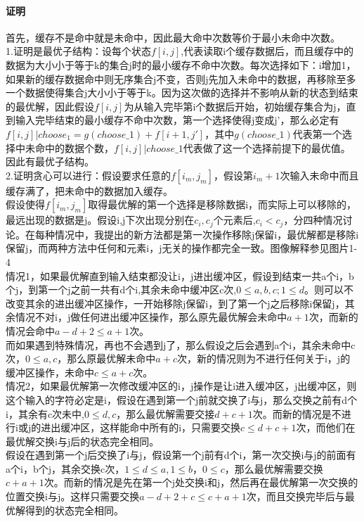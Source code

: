 \documentclass{article}
\begin{document}
\begin{CJK}{UTF8}{gkai}
\paragraph{证明}
首先，缓存不是命中就是未命中，因此最大命中次数等价于最小未命中次数。\\
1.证明是最优子结构：设每个状态$f[i,j]$,代表读取i个缓存数据后，而且缓存中的数据为大小小于等于k的集合j时的最小缓存不命中次数。每次选择如下：i增加1，如果新的缓存数据命中则无序集合j不变，否则j先加入未命中的数据，再移除至多一个数据使得集合j大小小于等于k。因为这次做的选择并不影响从新的状态到结束的最优解，因此假设$f[i,j]$为从输入完毕第i个数据后开始，初始缓存集合为j，直到输入完毕结束的最小缓存不命中次数，第一个选择使得j变成j'，那么必定有$f[i,j]|choose_1=g(choose\_1)+f[i+1,j']$，其中$g(choose\_1)$代表第一个选择中未命中的数据个数，$f[i,j]|choose\_1$代表做了这一个选择前提下的最优值。因此有最优子结构。\\
2.证明贪心可以进行：假设要求任意的$f[i_{m},j_{m}]$，假设第$i_{m}+1$次输入未命中而且缓存满了，把未命中的数据加入缓存。\\
假设使得$f[i_{m},j_{m}]$取得最优解的第一个选择是移除数据i，而实际上可以移除的，最远出现的数据是j。假设i,j下次出现分别在$c_{i},c_{j}$个元素后,$c_{i}<c_{j}$，分四种情况讨论。在每种情况中，我提出的新方法都是第一次操作移除j保留i，最优解都是移除i保留j，而两种方法中任何和元素i，j无关的操作都完全一致。图像解释参见图片1-4\\
情况1，如果最优解直到输入结束都没让i，j进出缓冲区，假设到结束一共a个i，b个j，到第一个j之前一共有d个i,其余未命中缓冲区c次,$0\leq a,b,c;1\leq d$。则可以不改变其余的进出缓冲区操作，一开始移除j保留i，到了第一个j之后移除i保留j，其余情况不对i，j做任何进出缓冲区操作，那么原先最优解会未命中$a+1$次，而新的情况会命中$a-d+2\leq a+1$次。\\
而如果遇到特殊情况，再也不会遇到j了，那么假设之后会遇到a个i，其余未命中c次，$0\leq a,c$，那么原最优解未命中$a+c$次，新的情况则为不进行任何关于i，j的缓冲区操作，未命中$c\leq a+c$次。\\
情况2，如果最优解第一次修改缓冲区的i，j操作是让i进入缓冲区，j出缓冲区，则这个输入的字符必定是i，假设在遇到第一个j前就交换了i与j，那么交换之前有d个i，其余有c次未中,$0\leq d,c$，那么最优解需要交接$d+c+1$次。而新的情况是不进行i或j的进出缓冲区，这样能命中所有的i，只需要交换$c\leq d+c+1$次，而他们在最优解交换i与j后的状态完全相同。\\
假设在遇到第一个j后交换了i与j，假设第一个j前有d个i，第一次交换i与j的前面有a个i，b个j，其余交换c次，$1\leq d\leq a,1\leq b，0\leq c$，那么最优解需要交换$c+a+1$次。而新的情况是先在第一个j处交换i和j，然后再在最优解第一次交换的位置交换i与j。这样只需要交换$a-d+2+c\leq c+a+1$次，而且交换完毕后与最优解得到的状态完全相同。\\

\end{CJK}
\end{document}
